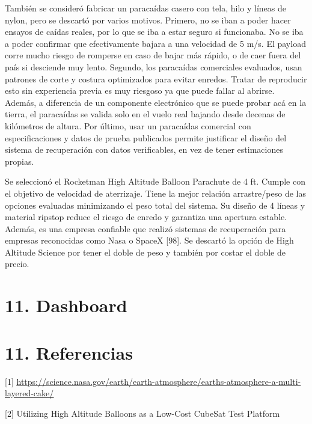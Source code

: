 \documentclass[12pt,a4paper]{article}
\begin{document}
También se consideró fabricar un paracaídas casero con tela, hilo y líneas de nylon, pero se descartó por varios motivos. Primero, no se iban a poder hacer ensayos de caídas reales, por lo que se iba a estar seguro si funcionaba. No se iba a poder confirmar que efectivamente bajara a una velocidad de 5 m/s. El payload corre mucho riesgo de romperse en caso de bajar más rápido, o de caer fuera del país si desciende muy lento. Segundo, los paracaídas comerciales evaluados, usan patrones de corte y costura optimizados para evitar enredos. Tratar de reproducir esto sin experiencia previa es muy riesgoso ya que puede fallar al abrirse. Además, a diferencia de un componente electrónico que se puede probar acá en la tierra, el paracaídas se valida solo en el vuelo real bajando desde decenas de kilómetros de altura. Por último, usar un paracaídas comercial con especificaciones y datos de prueba publicados permite justificar el diseño del sistema de recuperación con datos verificables, en vez de tener estimaciones propias.

Se seleccionó el Rocketman High Altitude Balloon Parachute de 4 ft. Cumple con el objetivo de velocidad de aterrizaje. Tiene la mejor relación arrastre/peso de las opciones evaluadas minimizando el peso total del sistema. Su diseño de 4 líneas y material ripstop reduce el riesgo de enredo y garantiza una apertura estable. Además, es una empresa confiable que realizó sistemas de recuperación para empresas reconocidas como Nasa o SpaceX {[}98{]}. Se descartó la opción de High Altitude Science por tener el doble de peso y también por costar el doble de precio.

\section{\texorpdfstring{\textbf{11. Dashboard}}{11. Dashboard}}\label{dashboard}

\textbf{\hfill\break
}

\section{\texorpdfstring{\textbf{11. Referencias}}{11. Referencias}}\label{referencias}

{[}1{]} \href{https://science.nasa.gov/earth/earth-atmosphere/earths-atmosphere-a-multi-layered-cake/}{\ul{https://science.nasa.gov/earth/earth-atmosphere/earths-atmosphere-a-multi-layered-cake/}}

{[}2{]} Utilizing High Altitude Balloons as a Low-Cost CubeSat Test Platform
\end{document}
